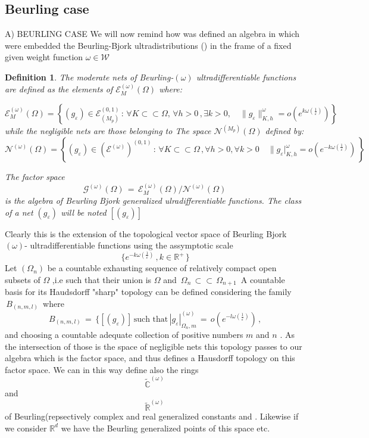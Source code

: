 \documentclass[12pt,a4paper]{amsart}
\newcommand{\CC}{\mathbb C}
\newcommand{\RR}{\mathbb R}
\newtheorem{definition}[theorem]{Definition}
\begin{document}
\subsection{Beurling case}
A) BEURLING CASE
We will now remind how was defined an algebra in which were embedded the Beurling-Bjork ultradistributions
(\cite{D.V.V.}) in the frame of a fixed given weight function
 $\omega\in\mathcal{W}$

\begin{definition}

The moderate nets of Beurling-$(\omega)$ ultradifferentiable functions are defined as the elements of $\mathcal{E}^{(\omega)}_M(\Omega)$ where:

\begin{equation*}
\mathcal{E}^{(\omega)}_M(\Omega) = \left\{(g_{\varepsilon}) \in \mathcal{E}^{(0,1)}_{(M_p)}\,:\,  \forall K \subset \subset \Omega,\,\forall h>0\,,\exists k>0 , \quad
    \| g_{\varepsilon}\|_{K,h}^{\omega} 
    =o(e^{k\omega(\frac{1}{\varepsilon})})\right\}
\end{equation*}  
while the negligible nets are  those belonging to 
The space $ \mathcal{N}^{(M_p)}(\Omega) $  defined by:
\begin{equation*}
\mathcal{N}^{(\omega)}(\Omega) = \left\{(g_{\varepsilon}) \in
 (\mathcal{E}^{(\omega)})^{(0,1)}
 \,:\, \forall K \subset \subset \Omega\,,
 \forall h>0, \forall k >0 \quad
\|g_{\varepsilon}|_ {K,h}^{\omega} =
 o(e^{-k\omega(\frac{1}{\varepsilon})}) \,\right\}
 \end{equation*}  

The factor space 
$$\mathcal{G}^{(\omega)}(\Omega) \,=\,
\mathcal{E}^{(\omega)}_M(\Omega)/\mathcal{N}^{(\omega)}(\Omega)$$
is the algebra of Beurling Bjork generalized ulradifferentiable functions.
The class of a net $(g_\varepsilon)$ will be noted 
$[(g_\varepsilon)]$

\end{definition}


Clearly this is the extension of the topological vector
space of Beurling Bjork $(\omega)$- ultradifferentiable functions using the assymptotic scale 
$$\,\{e^{-k\omega(\frac{1}{\varepsilon})}\,,
 k\in\RR^+\,\}$$
Let $(\Omega_n)$ be a countable exhausting sequence of relatively compact open subsets of $\Omega$ ,i.e 
 such that their union is $\Omega$  and
 $\,\Omega_n\,\subset\subset\,\Omega_{n+1}\,$
A countable basis for its Haudsdorff "sharp" topology can be defined considering the  family $\,B_{(n,m,l)}\,$
where
$$ \,B_{(n,m,l)}\,
=\,\{ [(g_\varepsilon)] \,\mbox{such that}\,
|g_\varepsilon|_{\Omega_n,m}^{(\omega)}\,
=\,o(e^{-l\omega(\frac{1}{\varepsilon})})\,,$$
and choosing a countable adequate collection of positive numbers  $m$ and $n$ .
As the intersection of those is the space of negligible nets this topology passes to our algebra which is the factor space, and thus defines a Hausdorff topology on this factor space.
 We can in this way define also the rings
 $$ \tilde{\CC}^{(\omega)}$$  and 
$$ \tilde{\RR}^{(\omega)}$$ 
 of Beurling(repsectively complex and real generalized constants and .
Likewise if we consider $\RR^d$ we have the Beurling generalized points of this space etc.
\end{document}
